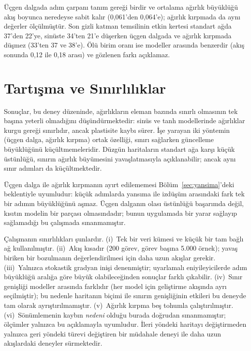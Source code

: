 \documentclass[conference,a4paper]{IEEEtran}
\begin{document}
Üçgen dalgada adım çarpanı tanım gereği birdir ve ortalama ağırlık büyüklüğü akış boyunca neredeyse sabit kalır
(0,061'den 0,064'e); ağırlık kırpmada da aynı değerler ölçülmüştür. Son gizli katman temsilinin etkin kertesi
standart ağda 37'den 22'ye, sinüste 34'ten 21'e düşerken üçgen dalgada ve ağırlık kırpmada düşmez (33'ten 37 ve
38'e). Ölü birim oranı ise modeller arasında benzerdir (akış sonunda 0,12 ile 0,18 arası) ve gözlenen farkı
açıklamaz.

\section{Tartışma ve Sınırlılıklar}

Sonuçlar, bu deney düzeninde, ağırlıkların eleman bazında sınırlı olmasının tek başına yeterli olmadığını
düşündürmektedir: sinüs ve tanh modellerinde ağırlıklar kurgu gereği sınırlıdır, ancak plastisite kaybı sürer.
İşe yarayan iki yöntemin (üçgen dalga, ağırlık kırpma) ortak özelliği, sınırı sağlarken güncelleme büyüklüğünü
küçültmemeleridir. Düzgün haritaların standart ağa karşı küçük üstünlüğü, sınırın ağırlık büyümesini
yavaşlatmasıyla açıklanabilir; ancak aynı sınır adımları da küçültmektedir.

Üçgen dalga ile ağırlık kırpmanın ayırt edilememesi Bölüm~\ref{sec:yansima}'deki beklentiyle uyumludur: küçük adımlarda yansıma
ile izdüşüm arasındaki fark tek bir adımın büyüklüğünü aşmaz. Üçgen dalganın olası üstünlüğü başarımda değil,
kısıtın modelin bir parçası olmasındadır; bunun uygulamada bir yarar sağlayıp sağlamadığı bu çalışmada
sınanmamıştır.

Çalışmanın sınırlılıkları şunlardır. (i)~Tek bir veri kümesi ve küçük bir tam bağlı ağ kullanılmıştır.
(ii)~Akış kısadır (200 görev, görev başına 5.000 örnek); yavaş biriken bir bozulmanın değerlendirilmesi için
daha uzun akışlar gerekir. (iii)~Yalnızca stokastik gradyan inişi denenmiştir; uyarlamalı eniyileyicilerde adım
büyüklüğü aralığa göre büyük olabileceğinden sonuçlar farklı çıkabilir. (iv)~Sınır genişliği modeller arasında
farklıdır (her model için geliştirme akışında ayrı seçilmiştir); bu nedenle haritanın biçimi ile sınırın
genişliğinin etkileri bu deneyde tam olarak ayrıştırılmamıştır. (v)~Ağırlık kırpma beş tohumla çalıştırılmıştır.
(vi)~Sönümlemenin kaybın \emph{nedeni} olduğu burada doğrudan sınanmamıştır; ölçümler yalnızca bu açıklamayla
uyumludur. İleri yöndeki haritayı değiştirmeden yalnızca geri yöndeki türevi değiştiren bir müdahale deneyi ile
daha uzun akışlardaki deneyler sürmektedir.
\end{document}
